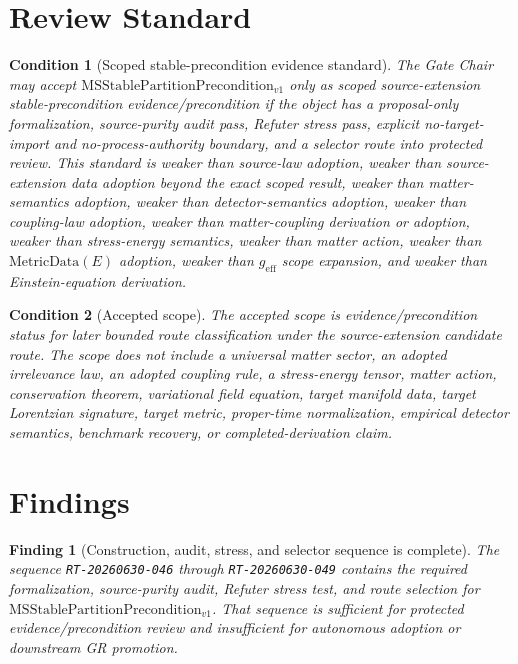 \documentclass[11pt]{article}
\newcommand{\MSStablePre}{\mathrm{MSStablePartitionPrecondition}_{v1}}
\newcommand{\MetricData}{\mathrm{MetricData}}
\newcommand{\geff}{g_{\mathrm{eff}}}
\newtheorem{finding}{Finding}
\newtheorem{condition}{Condition}
\begin{document}
\section{Review Standard}

\begin{condition}[Scoped stable-precondition evidence standard]
The Gate Chair may accept \(\MSStablePre\) only as scoped source-extension
stable-precondition evidence/precondition if the object has a proposal-only
formalization, source-purity audit pass, Refuter stress pass, explicit
no-target-import and no-process-authority boundary, and a selector route into
protected review. This standard is weaker than source-law adoption, weaker
than source-extension data adoption beyond the exact scoped result, weaker
than matter-semantics adoption, weaker than detector-semantics adoption,
weaker than coupling-law adoption, weaker than matter-coupling derivation or
adoption, weaker than stress-energy semantics, weaker than matter action,
weaker than \(\MetricData(E)\) adoption, weaker than \(\geff\) scope
expansion, and weaker than Einstein-equation derivation.
\end{condition}

\begin{condition}[Accepted scope]
The accepted scope is evidence/precondition status for later bounded route
classification under the source-extension candidate route. The scope does not
include a universal matter sector, an adopted irrelevance law, an adopted
coupling rule, a stress-energy tensor, matter action, conservation theorem,
variational field equation, target manifold data, target Lorentzian
signature, target metric, proper-time normalization, empirical detector
semantics, benchmark recovery, or completed-derivation claim.
\end{condition}

\section{Findings}

\begin{finding}[Construction, audit, stress, and selector sequence is complete]
The sequence \texttt{RT-20260630-046} through \texttt{RT-20260630-049}
contains the required formalization, source-purity audit, Refuter stress test,
and route selection for \(\MSStablePre\). That sequence is sufficient for
protected evidence/precondition review and insufficient for autonomous
adoption or downstream GR promotion.
\end{finding}
\end{document}
